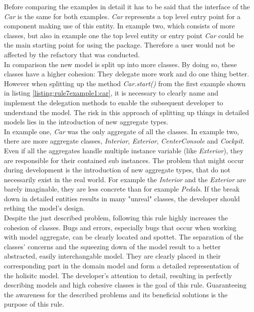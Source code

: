 Before comparing the examples in detail it has to be said that the interface of the \textit{Car} is the same for both examples. \textit{Car} represents a top level entry point for a component making use of this entity. In example two, which consists of more classes, but also in example one the top level entity or entry point \textit{Car} could be the main starting point for using the package. Therefore a user would not be affected by the refactory that was conducted. 
\\

In comparison the new model is split up into more classes. By doing so, these classes have a higher cohesion: They delegate more work and do one thing better. However when splitting up the method \textit{Car.start()} from the first example shown in listing \ref{listing:rule7example1:car}, it is necessary to clearly name and implement the delegation methods to enable the subsequent developer to understand the model. The risk in this approach of splitting up things in detailed models lies in the introduction of new aggregate types. 
\\

In example one, \textit{Car} was the only aggregate of all the classes. In example two, there are more aggregate classes, \textit{Interior}, \textit{Exterior}, \textit{CenterConsole} and \textit{Cockpit}. Even if all the aggregates handle multiple instance variable (like \textit{Exterior}), they are responsible for their contained sub instances. The problem that might occur during development is the introduction of new aggregate types, that do not necessarily exist in the real world. For example the \textit{Interior} and the \textit{Exterior} are barely imaginable, they are less concrete than for example \textit{Pedals}. If the break down in detailed entities results in many "unreal" classes, the developer should rething the model's design. 
\\

Despite the just described problem, following this rule highly increases the cohesion of classes. Bugs and errors, especially bugs that occur when working with model aggregate, can be clearly located and spottet. The separation of the classes' concerns and the squeezing down of the model result to a better abstracted, easily interchangable model. They are clearly placed in their corresponding part in the domain model and form a detailed representation of the holisitc model. The developer's attention to detail, resulting in perfectly describing models and high cohesive classes is the goal of this rule. Guaranteeing the awareness for the described problems and its beneficial solutions is the purpose of this rule. 

